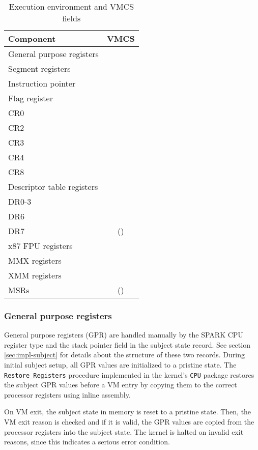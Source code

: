 \begin{table}[h]
	\centering
	\begin{tabular}{l|c}
		\textbf{Component} & \textbf{VMCS} \\
		\hline
		General purpose registers  & \\
		Segment registers          & \checkmark \\
		Instruction pointer        & \checkmark \\
		Flag register              & \checkmark \\
		CR0                        & \checkmark \\
		CR2                        & \\
		CR3                        & \checkmark \\
		CR4                        & \checkmark \\
		CR8                        & \\
		Descriptor table registers & \checkmark \\
		DR0-3                      & \\
		DR6                        & \\
		DR7                        & (\checkmark) \\
		x87 FPU registers          & \\
		MMX registers              & \\
		XMM registers              & \\
		MSRs                       & (\checkmark) \\
	\end{tabular}
	\caption{Execution environment and VMCS fields}
	\label{tab:exec-env-storage}
\end{table}

\subsubsection{General purpose registers}
General purpose registers (GPR) are handled manually by the SPARK
CPU register type and the stack pointer field in the subject state record. See
section \ref{sec:impl-subject} for details about the structure of these two
records.  During initial subject setup, all GPR values are initialized to a
pristine state. The \texttt{Restore\_Registers} procedure implemented in the
kernel's \texttt{CPU} package restores the subject GPR values before a VM entry
by copying them to the correct processor registers using inline assembly.

On VM exit, the subject state in memory is reset to a pristine state. Then, the
VM exit reason is checked and if it is valid, the GPR values are copied from the
processor registers into the subject state. The kernel is halted on invalid exit
reasons, since this indicates a serious error condition.

